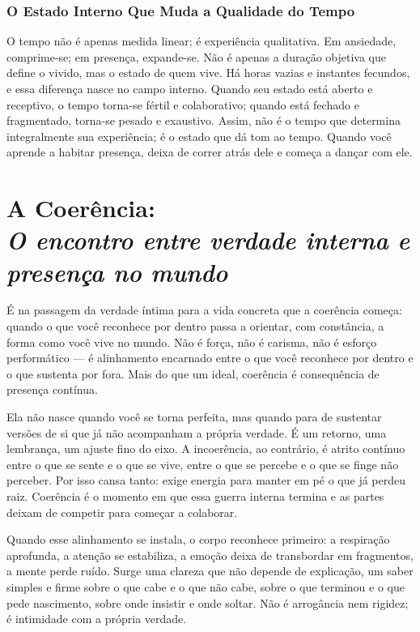 \documentclass[12pt]{book}
\begin{document}
\subsection*{O Estado Interno Que Muda a Qualidade do Tempo}

O tempo não é apenas medida linear; é experiência qualitativa. Em ansiedade, comprime-se; em presença, expande-se. Não é apenas a duração objetiva que define o vivido, mas o estado de quem vive. Há horas vazias e instantes fecundos, e essa diferença nasce no campo interno. Quando seu estado está aberto e receptivo, o tempo torna-se fértil e colaborativo; quando está fechado e fragmentado, torna-se pesado e exaustivo. Assim, não é o tempo que determina integralmente sua experiência; é o estado que dá tom ao tempo. Quando você aprende a habitar presença, deixa de correr atrás dele e começa a dançar com ele.

\chapter[A Coerência: O encontro entre verdade interna e presença no mundo]{A Coerência:\\[0.4ex]\large\itshape O encontro entre verdade interna e presença no mundo}

É na passagem da verdade íntima para a vida concreta que a coerência começa: quando o que você reconhece por dentro passa a orientar, com constância, a forma como você vive no mundo. Não é força, não é carisma, não é esforço performático — é alinhamento encarnado entre o que você reconhece por dentro e o que sustenta por fora. Mais do que um ideal, coerência é consequência de presença contínua.

Ela não nasce quando você se torna perfeita, mas quando para de sustentar versões de si que já não acompanham a própria verdade. É um retorno, uma lembrança, um ajuste fino do eixo. A incoerência, ao contrário, é atrito contínuo entre o que se sente e o que se vive, entre o que se percebe e o que se finge não perceber. Por isso cansa tanto: exige energia para manter em pé o que já perdeu raiz. Coerência é o momento em que essa guerra interna termina e as partes deixam de competir para começar a colaborar.

Quando esse alinhamento se instala, o corpo reconhece primeiro: a respiração aprofunda, a atenção se estabiliza, a emoção deixa de transbordar em fragmentos, a mente perde ruído. Surge uma clareza que não depende de explicação, um saber simples e firme sobre o que cabe e o que não cabe, sobre o que terminou e o que pede nascimento, sobre onde insistir e onde soltar. Não é arrogância nem rigidez; é intimidade com a própria verdade.
\end{document}

